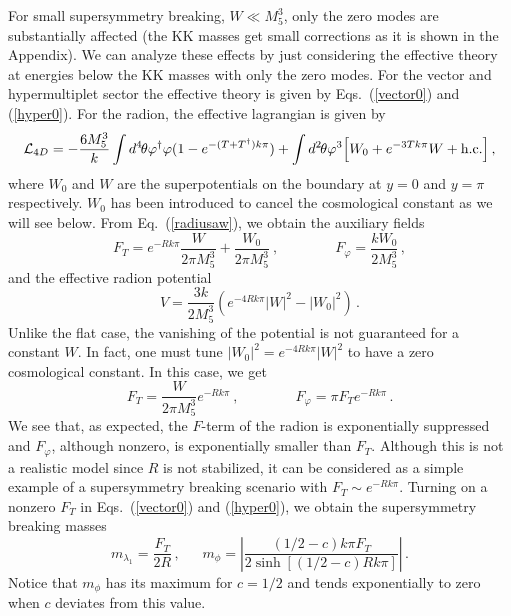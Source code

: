 \documentclass[a4paper,12pt]{article}
\begin{document}
For small supersymmetry breaking, $W\ll M_5^3$,
only the zero modes are substantially affected
(the KK masses get  small 
corrections as it is shown in the Appendix).
We can analyze these effects 
by just
considering   the effective theory at energies
below the KK masses with only the zero modes.
For the vector and hypermultiplet sector 
the effective theory 
is given  by Eqs.~(\ref{vector0}) and (\ref{hyper0}).
For the  radion,  the effective lagrangian is 
given by \cite{radion}
\begin{equation}
{\cal L}_{4D}=-\frac{6M^3_5}{k}
\int d^4\mspace{-2mu}\theta \varphi^\dagger\varphi 
(1-e^{-(T+T^\dagger)k\pi})+
\int d^2\mspace{-2mu}\theta 
\varphi^3 \Big[W_0+e^{-3Tk\pi}W+\text{h.c.}\Big]\, ,
\label{radiusaw}
\end{equation}
where $W_0$ and $W$ are  the superpotentials
on the boundary at $y=0$ and 
$y=\pi$ respectively.
$W_0$ has been introduced to cancel the cosmological 
constant as we will see below.
{}From Eq.~(\ref{radiusaw}), we obtain the auxiliary fields
\begin{equation}
F_T=e^{-Rk\pi}\frac{W}{2\pi M^3_5}+\frac{W_0}{2\pi M^3_5}\
,\qquad\qquad  F_\varphi=\frac{k W_0}{2 M^3_5}\, ,
\end{equation}
and the effective radion potential
\begin{equation}
V=\frac{3k}{2M^3_5}\left(e^{-4Rk\pi}|W|^2-|W_0|^2\right)\, .
\end{equation}
Unlike the flat case,
the vanishing of the potential 
is not guaranteed for a constant $W$.
In fact, one must tune 
$|W_0|^2=e^{-4Rk\pi}|W|^2$ to have a zero cosmological 
constant.
In this case, we get
\begin{equation}
F_T=\frac{W}{2\pi M^3_5}e^{-Rk\pi}\
,\qquad\qquad  F_\varphi=
\pi F_Te^{-Rk\pi}\, .
\label{ftwarped}
\end{equation}
We see that, as expected,  
the $F$-term of the radion is exponentially suppressed
and $F_\varphi$, although nonzero, is exponentially smaller
than $F_T$.
Although
this is not a realistic model since $R$ is not stabilized,
it can be considered as a simple example of 
a supersymmetry breaking scenario with  $F_T\sim e^{-Rk\pi}$.
Turning on a nonzero $F_T$
in Eqs.~(\ref{vector0}) and (\ref{hyper0}),
we obtain the supersymmetry breaking masses
\begin{equation}
m_{\lambda_1}=\frac{F_T}{2R}\, , 
\ \ \ \ \ \ \ 
m_\phi=\left|\frac{(1/2-c)k\pi F_T}{2\sinh[(1/2-c)Rk\pi]}\right|\, .
\label{softmasses}
\end{equation}
Notice that $m_\phi$  has its maximum for $c=1/2$ and tends exponentially
to zero   when $c$ deviates  from this value. 
\end{document}
